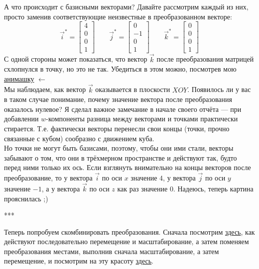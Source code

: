 \documentclass[a3paper,14pt]{extarticle}
\begin{document}
А что происходит с базисными векторами? Давайте рассмотрим каждый из них, просто заменив соответствующие неизвестные в преобразованном векторе:
$$\vec{i}^* = \begin{bmatrix}
    4 \\ 0 \\ 0 \\ 1
\end{bmatrix}\qquad\vec{j}^* = \begin{bmatrix}
    0 \\ -1 \\ 0 \\ 1
\end{bmatrix}\qquad\vec{k}^* = \begin{bmatrix}
    0 \\ 0 \\ 0 \\ 1
\end{bmatrix}$$
С одной стороны может показаться, что вектор $\vec{k}$ после преобразования матрицей схлопнулся в точку, но это не так. Убедиться в этом можно, посмотрев мою \href{https://disk.yandex.ru/i/xr_fvZ_HHKuUVA}{анимашку} $\leftarrow$\\[0.5em]
Мы наблюдаем, как вектор $\vec{k}$ оказывается в плоскости $XOY$. Появилось ли у вас в таком случае понимание, почему значение вектора после преобразования оказалось нулевое? Я сделал важное замечание в начале своего отчёта --- при добавлении $w$-компоненты разница между векторами и точками практически стирается. Т.е. фактически векторы перенесли свои концы (точки, прочно связанные с кубом) сообразно с движением куба.\\[0.5em]
Но точки не могут быть базисами, поэтому, чтобы они ими стали, векторы забывают о том, что они в трёхмерном пространстве и действуют так, будто перед ними только их ось. Если взглянуть внимательно на концы векторов после преобразование, то у вектора $\vec{i}$ по оси $x$ значение $4$, у вектора $\vec{j}$ по оси $y$ значение $-1$, а у вектора $\vec{k}$ по оси $z$ как раз значение $0$. Надеюсь, теперь картина прояснилась ;)
\begin{center}
    ***
\end{center}
Теперь попробуем скомбинировать преобразования. Сначала посмотрим \href{https://disk.yandex.ru/i/LH7VCjDJ-MA91Q}{здесь}, как действуют последовательно перемещение и масштабирование, а затем поменяем преобразования местами, выполнив сначала масштабирование, а затем перемещение, и посмотрим на эту красоту \href{https://disk.yandex.ru/i/lP76mzPYP1p4Iw}{здесь}.\\[0.5em]
\end{document}
